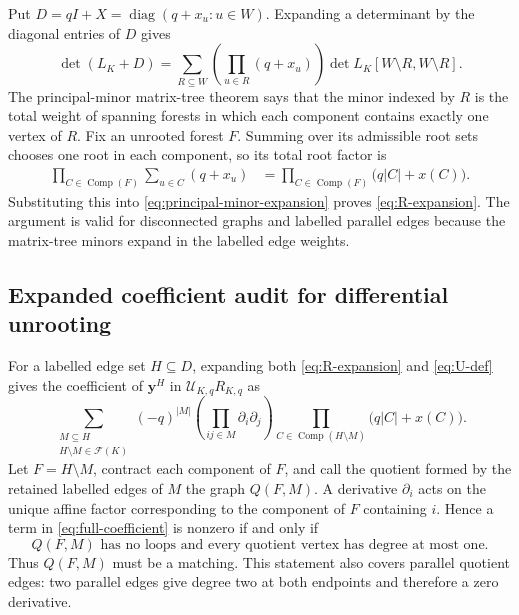 \documentclass[11pt]{article}
\numberwithin{equation}{section}
\newcommand{\cF}{\mathcal F}
\newcommand{\yy}{\bm y}
\newcommand{\diag}{\operatorname{diag}}
\newcommand{\Comp}{\operatorname{Comp}}
\begin{document}
Put $D=qI+X=\diag(q+x_u:u\in W)$.  Expanding a determinant by the diagonal entries of $D$ gives
\begin{equation}\label{eq:principal-minor-expansion}
 \det(L_K+D)
 =\sum_{R\subseteq W}
  \left(\prod_{u\in R}(q+x_u)\right)
  \det L_K[W\setminus R,W\setminus R].
\end{equation}
The principal-minor matrix-tree theorem says that the minor indexed by $R$ is the total weight of spanning forests in which each component contains exactly one vertex of $R$.  Fix an unrooted forest $F$.  Summing over its admissible root sets chooses one root in each component, so its total root factor is
\begin{align*}
 \prod_{C\in\Comp(F)}\sum_{u\in C}(q+x_u)
 &=\prod_{C\in\Comp(F)}\bigl(q|C|+x(C)\bigr).
\end{align*}
Substituting this into \eqref{eq:principal-minor-expansion} proves \eqref{eq:R-expansion}.  The argument is valid for disconnected graphs and labelled parallel edges because the matrix-tree minors expand in the labelled edge weights.

\subsection{Expanded coefficient audit for differential unrooting}\label{app:coefficient-audit}

For a labelled edge set $H\subseteq D$, expanding both \eqref{eq:R-expansion} and \eqref{eq:U-def} gives the coefficient of $\yy^H$ in $\mathcal U_{K,q}R_{K,q}$ as
\begin{equation}\label{eq:full-coefficient}
 \sum_{\substack{M\subseteq H\\H\setminus M\in\cF(K)}}
 (-q)^{|M|}
 \left(\prod_{ij\in M}\partial_i\partial_j\right)
 \prod_{C\in\Comp(H\setminus M)}\bigl(q|C|+x(C)\bigr).
\end{equation}
Let $F=H\setminus M$, contract each component of $F$, and call the quotient formed by the retained labelled edges of $M$ the graph $Q(F,M)$.  A derivative $\partial_i$ acts on the unique affine factor corresponding to the component of $F$ containing $i$.  Hence a term in \eqref{eq:full-coefficient} is nonzero if and only if
\begin{equation}\label{eq:matching-condition}
 Q(F,M)\text{ has no loops and every quotient vertex has degree at most one.}
\end{equation}
Thus $Q(F,M)$ must be a matching.  This statement also covers parallel quotient edges: two parallel edges give degree two at both endpoints and therefore a zero derivative.
\end{document}
